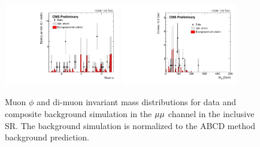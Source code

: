 \begin{figure}
\centering
\includegraphics[width=0.45\textwidth]{figures/results/mumu_observation/muonPhi.pdf}
\includegraphics[width=0.45\textwidth]{figures/results/mumu_observation/diMuonInvMass.pdf}
\caption{Muon $\phi$ and di-muon invariant mass distributions for data and composite background simulation in the ${\mu}{\mu}$ channel in the inclusive SR. The background simulation is normalized to the ABCD method background prediction.}
\label{mumu_observed_phi}
\end{figure}